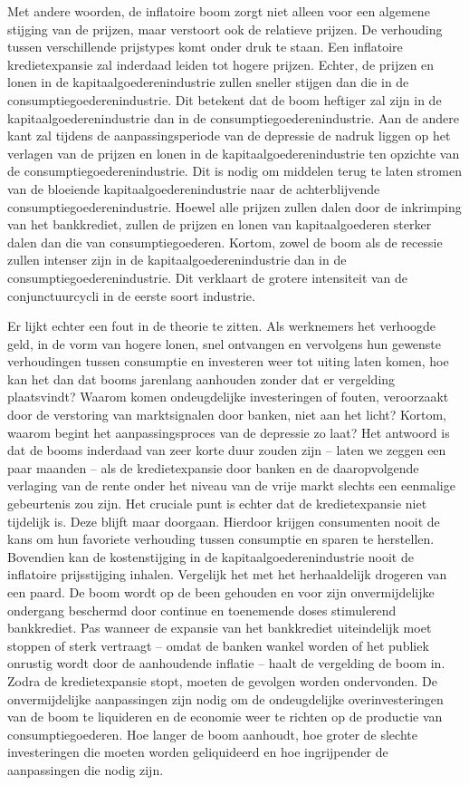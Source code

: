 \documentclass[
  a5paper,
  smalldemyvopaper,10pt,twoside,onecolumn,openright,extrafontsizes,hidelinks]{memoir}
\begin{document}
Met andere woorden, de inflatoire boom zorgt niet alleen voor een
algemene stijging van de prijzen, maar verstoort ook de relatieve
prijzen. De verhouding tussen verschillende prijstypes komt onder druk
te staan. Een inflatoire kredietexpansie zal inderdaad leiden tot hogere
prijzen. Echter, de prijzen en lonen in de kapitaalgoederenindustrie
zullen sneller stijgen dan die in de consumptiegoederenindustrie. Dit
betekent dat de boom heftiger zal zijn in de kapitaalgoederenindustrie
dan in de consumptiegoederenindustrie. Aan de andere kant zal tijdens de
aanpassingsperiode van de depressie de nadruk liggen op het verlagen van
de prijzen en lonen in de kapitaalgoederenindustrie ten opzichte van de
consumptiegoederenindustrie. Dit is nodig om middelen terug te laten
stromen van de bloeiende kapitaalgoederenindustrie naar de
achterblijvende consumptiegoederenindustrie. Hoewel alle prijzen zullen
dalen door de inkrimping van het bankkrediet, zullen de prijzen en lonen
van kapitaalgoederen sterker dalen dan die van consumptiegoederen.
Kortom, zowel de boom als de recessie zullen intenser zijn in de
kapitaalgoederenindustrie dan in de consumptiegoederenindustrie. Dit
verklaart de grotere intensiteit van de conjunctuurcycli in de eerste
soort industrie.

Er lijkt echter een fout in de theorie te zitten. Als werknemers het
verhoogde geld, in de vorm van hogere lonen, snel ontvangen en
vervolgens hun gewenste verhoudingen tussen consumptie en investeren
weer tot uiting laten komen, hoe kan het dan dat booms jarenlang
aanhouden zonder dat er vergelding plaatsvindt? Waarom komen
ondeugdelijke investeringen of fouten, veroorzaakt door de verstoring
van marktsignalen door banken, niet aan het licht? Kortom, waarom begint
het aanpassingsproces van de depressie zo laat? Het antwoord is dat de
booms inderdaad van zeer korte duur zouden zijn -- laten we zeggen een
paar maanden -- als de kredietexpansie door banken en de daaropvolgende
verlaging van de rente onder het niveau van de vrije markt slechts een
eenmalige gebeurtenis zou zijn. Het cruciale punt is echter dat de
kredietexpansie niet tijdelijk is. Deze blijft maar doorgaan. Hierdoor
krijgen consumenten nooit de kans om hun favoriete verhouding tussen
consumptie en sparen te herstellen. Bovendien kan de kostenstijging in
de kapitaalgoederenindustrie nooit de inflatoire prijsstijging inhalen.
Vergelijk het met het herhaaldelijk drogeren van een paard. De boom
wordt op de been gehouden en voor zijn onvermijdelijke ondergang
beschermd door continue en toenemende doses stimulerend bankkrediet. Pas
wanneer de expansie van het bankkrediet uiteindelijk moet stoppen of
sterk vertraagt -- omdat de banken wankel worden of het publiek onrustig
wordt door de aanhoudende inflatie -- haalt de vergelding de boom in.
Zodra de kredietexpansie stopt, moeten de gevolgen worden ondervonden.
De onvermijdelijke aanpassingen zijn nodig om de ondeugdelijke
overinvesteringen van de boom te liquideren en de economie weer te
richten op de productie van consumptiegoederen. Hoe langer de boom
aanhoudt, hoe groter de slechte investeringen die moeten worden
geliquideerd en hoe ingrijpender de aanpassingen die nodig zijn.
\end{document}
